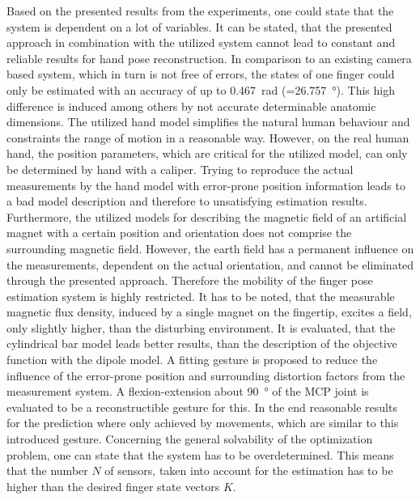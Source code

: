 Based on the presented results from the experiments, one could state that the system is dependent on a lot of variables. It can be stated, that the presented approach in combination with the utilized system cannot lead to constant and reliable results for hand pose reconstruction. In comparison to an existing camera based system, which in turn is not free of errors, the states of one finger could only be estimated with an accuracy of up to \SI{0.467}{\radian} (=\SI{26.757}{\degree}). This high difference is induced among others by not accurate determinable anatomic dimensions. The utilized hand model simplifies the natural human behaviour and constraints the range of motion in a reasonable way. However, on the real human hand, the position parameters, which are critical for the utilized model, can only be determined by hand with a caliper. Trying to reproduce the actual measurements by the hand model with error-prone position information leads to a bad model description and therefore to unsatisfying estimation results. Furthermore, the utilized models for describing the magnetic field of an artificial magnet with a certain position and orientation does not comprise the surrounding magnetic field. However, the earth field has a permanent influence on the measurements, dependent on the actual orientation, and cannot be eliminated through the presented approach. Therefore the mobility of the finger pose estimation system is highly restricted. It has to be noted, that the measurable magnetic flux density, induced by a single magnet on the fingertip, excites a field, only slightly higher, than the disturbing environment. It is evaluated, that the cylindrical bar model leads better results, than the description of the objective function with the dipole model. A fitting gesture is proposed to reduce the influence of the error-prone position and surrounding distortion factors from the measurement system. A flexion-extension about \SI{90}{\degree} of the \ac{MCP} joint is evaluated to be a reconstructible gesture for this. In the end reasonable results for the prediction where only achieved by movements, which are similar to this introduced gesture. Concerning the general solvability of the optimization problem, one can state that the system has to be overdetermined. This means that the number $ N $ of sensors, taken into account for the estimation has to be higher than the desired finger state vectors $ K $. 



